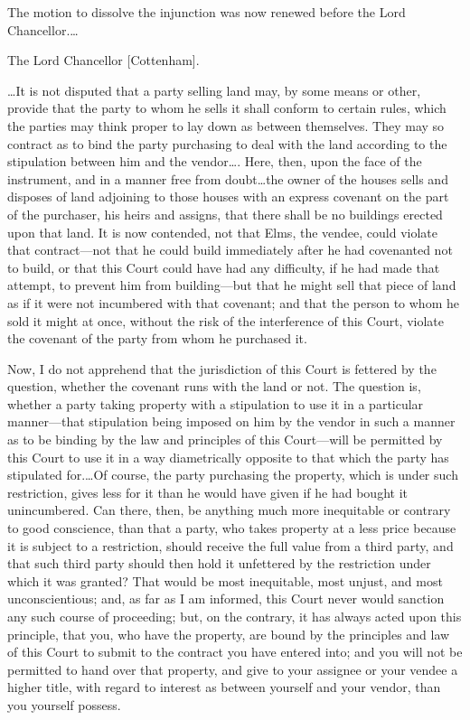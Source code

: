 The motion to dissolve the injunction was now renewed before the Lord
Chancellor.\ldots

\opinion The Lord Chancellor [Cottenham].

\ldots It is not disputed that a party selling land may, by some means or other,
provide that the party to whom he sells it shall conform to certain rules, which
the parties may think proper to lay down as between themselves. They may so
contract as to bind the party purchasing to deal with the land according to the
stipulation between him and the vendor\ldots . Here, then, upon the face of the
instrument, and in a manner free from doubt\ldots the owner of the houses sells
and disposes of land adjoining to those houses with an express covenant on the
part of the purchaser, his heirs and assigns, that there shall be no buildings
erected upon that land. It is now contended, not that Elms, the vendee, could
violate that contract---not that he could build immediately after he had
covenanted not to build, or that this Court could have had any difficulty, if he
had made that attempt, to prevent him from building---but that he might sell
that piece of land as if it were not incumbered with that covenant; and that the
person to whom he sold it might at once, without the risk of the interference of
this Court, violate the covenant of the party from whom he purchased it.

Now, I do not apprehend that the jurisdiction of this Court is fettered by the
question, whether the covenant runs with the land or not. The question is,
whether a party taking property with a stipulation to use it in a particular
manner---that stipulation being imposed on him by the vendor in such a manner as
to be binding by the law and principles of this Court---will be permitted by
this Court to use it in a way diametrically opposite to that which the party has
stipulated for.\ldots Of course, the party purchasing the property, which is
under such restriction, gives less for it than he would have given if he had
bought it unincumbered. Can there, then, be anything much more inequitable or
contrary to good conscience, than that a party, who takes property at a less
price because it is subject to a restriction, should receive the full value from
a third party, and that such third party should then hold it unfettered by the
restriction under which it was granted? That would be most inequitable, most
unjust, and most unconscientious; and, as far as I am informed, this Court never
would sanction any such course of proceeding; but, on the contrary, it has
always acted upon this principle, that you, who have the property, are bound by
the principles and law of this Court to submit to the contract you have entered
into; and you will not be permitted to hand over that property, and give to your
assignee or your vendee a higher title, with regard to interest as between
yourself and your vendor, than you yourself possess.

